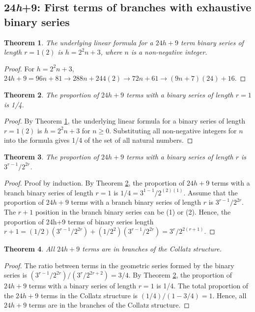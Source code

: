 \documentclass[sn-mathphys-num, pdflatex]{sn-jnl}
\newtheorem{theorem}{Theorem}[section]
\begin{document}
\subsection{24\textit{h}+9: First terms of branches with exhaustive binary series}\label{sec6.2}
\begin{theorem}\label{th:24h9_base}
    The underlying linear formula for a $24h+9$ term binary series of length $r=1 (2)$ is $h=2^2n+3$, where $n$ is a non-negative integer.
\end{theorem}
\begin{proof}
    For $h=2^2n+3$, $24h+9 = 96n+81\to 288n+244(2)\to 72n+61\to (9n+7)(24)+16$. 
\end{proof}

\begin{theorem}\label{th:24h9_prop}
    The proportion of $24h+9$ terms with a binary series of length $r=1$ is 1/4.
\end{theorem}
\begin{proof}
    By Theorem \ref{th:24h9_base}, the underlying linear formula for a binary series of length $r=1 (2)$ is $h=2^2n+3$ for $n \ge 0$. Substituting all non-negative integers for $n$ into the formula gives 1/4 of the set of all natural numbers. 
\end{proof}

\begin{theorem}
    The proportion of $24h+9$ terms with a binary series of length $r$ is $3^{r-1}/2^{2r}$.
\end{theorem}
\begin{proof}
    Proof by induction.
    By Theorem \ref{th:24h9_prop}, the proportion of $24h+9$ terms with a branch binary series of length $r=1$ is $1/4 = 3^{1-1}/2^{(2)(1)}$.
    Assume that the proportion of $24h+9$ terms with a branch binary series of length $r$ is $3^{r-1}/2^{2r}$.
    The $r+1$ position in the branch binary series can be (1) or (2).
    Hence, the proportion of 24h+9 terms of binary series length $r+1 = (1/2)(3^{r-1}/2^{2r})+(1/2^2)(3^{r-1}/2^{2r}) = 3^r/2^{2(r+1)}$.
\end{proof}

\begin{theorem}\label{th:24h9_final}
    All $24h+9$ terms are in branches of the Collatz structure.
\end{theorem}
\begin{proof}
    The ratio between terms in the geometric series formed by the binary series is $(3^{r-1}/2^{2r}) / (3^r/2^{2r+2}) = 3/4$.
    By Theorem \ref{th:24h9_prop}, the proportion of $24h+9$ terms with a binary series of length $r=1$ is 1/4.
    The total proportion of the $24h+9$ terms in the Collatz structure is $(1/4)/(1 - 3/4) = 1$.
    Hence, all $24h+9$ terms are in the branches of the Collatz structure.
\end{proof}
\end{document}
